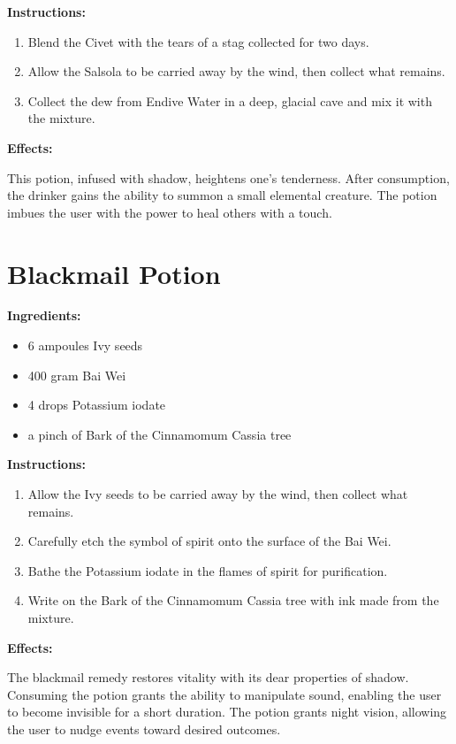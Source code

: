 \documentclass{article}
\begin{document}
\textbf{Instructions:}

\begin{enumerate}
  \item Blend the Civet with the tears of a stag collected for two days.
  \item Allow the Salsola to be carried away by the wind, then collect what remains.
  \item Collect the dew from Endive Water in a deep, glacial cave and mix it with the mixture.
\end{enumerate}

\textbf{Effects:}

This potion, infused with shadow, heightens one's tenderness. After consumption, the drinker gains the ability to summon a small elemental creature. The potion imbues the user with the power to heal others with a touch.

\newpage
\section*{Blackmail Potion}

\textbf{Ingredients:}

\begin{itemize}
  \item 6 ampoules Ivy seeds
  \item 400 gram Bai Wei
  \item 4 drops Potassium iodate
  \item a pinch of Bark of the Cinnamomum Cassia tree
\end{itemize}

\textbf{Instructions:}

\begin{enumerate}
  \item Allow the Ivy seeds to be carried away by the wind, then collect what remains.
  \item Carefully etch the symbol of spirit onto the surface of the Bai Wei.
  \item Bathe the Potassium iodate in the flames of spirit for purification.
  \item Write on the Bark of the Cinnamomum Cassia tree with ink made from the mixture.
\end{enumerate}

\textbf{Effects:}

The blackmail remedy restores vitality with its dear properties of shadow. Consuming the potion grants the ability to manipulate sound, enabling the user to become invisible for a short duration. The potion grants night vision, allowing the user to nudge events toward desired outcomes.
\end{document}
